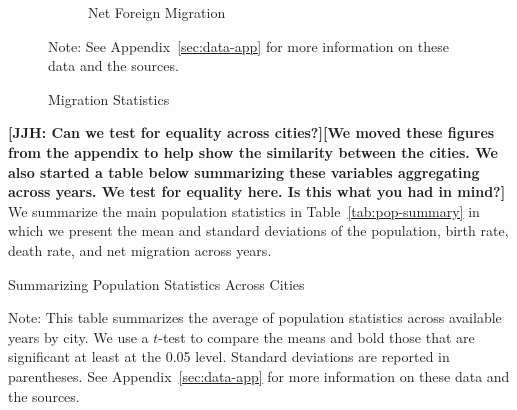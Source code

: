 \begin{figure}[H]
\begin{center}
\begin{subfigure}[ht]{0.48\textwidth}
        \caption{Net Foreign Migration}
        \end{subfigure}
      \caption{Migration Statistics}  \label{fig:emigr-immigr}
      \end{center}
         \raggedright  Note: See Appendix~\ref{sec:data-app} for more information on these data and the sources.
    \end{figure}
   
   \textbf{[JJH: Can we test for equality across cities?][We moved these figures from the appendix to help show the similarity between the cities. We also started a table below summarizing these variables aggregating across years. We test for equality here. Is this what you had in mind?]}
    We summarize the main population statistics in Table~\ref{tab:pop-summary} in which we present the mean and standard deviations of the population, birth rate, death rate, and net migration across years.
    

    \begin{table}[H]
    \centering
    \caption{Summarizing Population Statistics Across Cities}\label{tab:pop-summary}
    \begin{threeparttable}
	
	
\begin{tablenotes}
\item \footnotesize Note: This table summarizes the average of population statistics across available years by city. We use a $t$-test to compare the means and bold those that are significant at least at the 0.05 level. Standard deviations are reported in parentheses. See Appendix~\ref{sec:data-app} for more information on these data and the sources.
\end{tablenotes}
\end{threeparttable}
\end{table}
	
    
